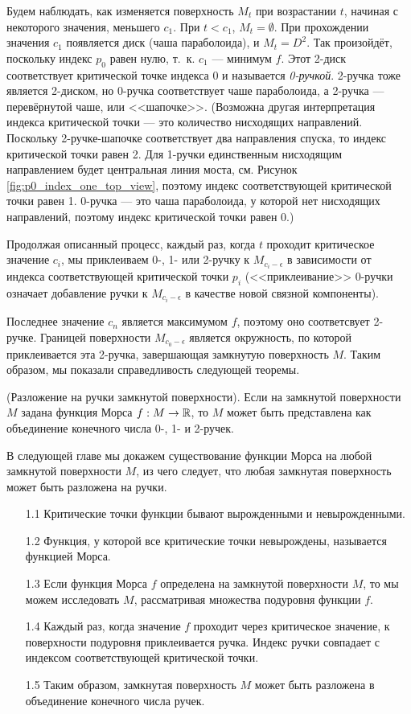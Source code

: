 \documentclass[a4paper,12pt,openany,leqno]{extbook}
\begin{document}
Будем наблюдать, как изменяется поверхность $M_t$ при возрастании $t$, начиная с некоторого значения, меньшего $c_1$. При $t < c_1$, $M_t = \emptyset$. При прохождении значения $c_1$ появляется диск (чаша параболоида), и $M_t = D^2$. Так произойдёт, поскольку индекс $p_0$ равен нулю, т.~к. $c_1$ --- минимум $f$. Этот 2-диск соответствует критической точке индекса 0 и называется \emph{0-ручкой}. 2-ручка тоже является 2-диском, но 0-ручка соответствует чаше параболоида, а 2-ручка --- перевёрнутой чаше, или <<шапочке>>. (Возможна другая интерпретация индекса критической точки --- это количество нисходящих направлений. Поскольку 2-ручке-шапочке соответствует два направления спуска, то индекс критической точки равен 2. Для 1-ручки единственным нисходящим направлением будет центральная линия моста, см. Рисунок \ref{fig:p0_index_one_top_view}, поэтому индекс соответствующей критической точки равен 1. 0-ручка --- это чаша параболоида, у которой нет нисходящих направлений, поэтому индекс критической точки равен 0.)

Продолжая описанный процесс, каждый раз, когда $t$ проходит критическое значение $c_i$, мы приклеиваем 0-, 1- или 2-ручку к $M_{c_i - \epsilon}$ в зависимости от индекса соответствующей критической точки $p_i$ (<<приклеивание>> 0-ручки означает добавление ручки к $M_{c_i - \epsilon}$ в качестве новой связной компоненты).

Последнее значение $c_n$ является максимумом $f$, поэтому оно соответсвует 2-ручке. Границей поверхности $M_{c_0 - \epsilon}$ является окружность, по которой приклеивается эта 2-ручка, завершающая замкнутую поверхность $M$. Таким образом, мы показали справедливость следующей теоремы.

\begin{theorem} (Разложение на ручки замкнутой поверхности). Если на замкнутой поверхности $M$ задана функция Морса $f : M \to \mathbb{R}$, то $M$ может быть представлена как объединение конечного числа 0-, 1- и 2-ручек.
\end{theorem}

В следующей главе мы докажем существование функции Морса на любой замкнутой поверхности $M$, из чего следует, что любая замкнутая поверхность может быть разложена на ручки.

\begin{itemize}
\item[1.1] Критические точки функции бывают вырожденными и невырожденными.
\item[1.2] Функция, у которой все критические точки невырождены, называется функцией Морса.
\item[1.3] Если функция Морса $f$ определена на замкнутой поверхности $M$, то мы можем исследовать $M$, рассматривая множества подуровня функции $f$.
\item[1.4] Каждый раз, когда значение $f$ проходит через критическое значение, к поверхности подуровня приклеивается ручка. Индекс ручки совпадает с индексом соответствующей критической точки.
\item[1.5] Таким образом, замкнутая поверхность $M$ может быть разложена в объединение конечного числа ручек.
\end{itemize}
\end{document}
